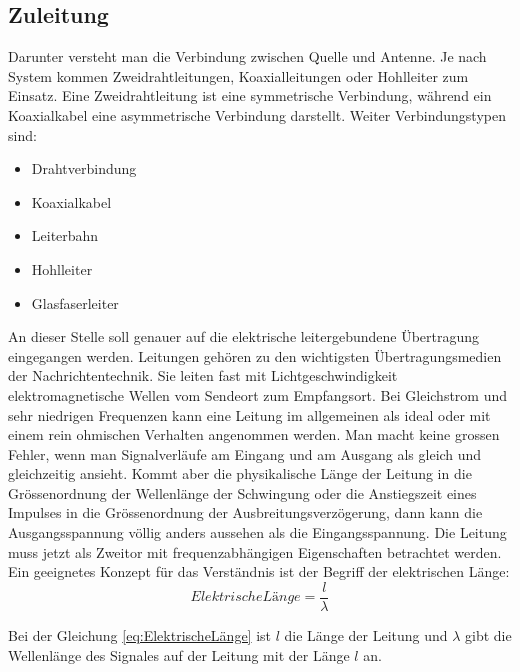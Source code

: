 \subsection{Zuleitung}
Darunter versteht man die Verbindung zwischen Quelle und Antenne. Je nach System kommen Zweidrahtleitungen, Koaxialleitungen oder Hohlleiter zum Einsatz. Eine Zweidrahtleitung ist eine symmetrische Verbindung, während ein Koaxialkabel eine asymmetrische Verbindung darstellt.
Weiter Verbindungstypen sind:
\begin{itemize}
\item Drahtverbindung
\item Koaxialkabel
\item Leiterbahn
\item Hohlleiter
\item Glasfaserleiter
\end{itemize}
An dieser Stelle soll genauer auf die elektrische leitergebundene Übertragung eingegangen werden.
Leitungen gehören zu den wichtigsten Übertragungsmedien der Nachrichtentechnik. Sie leiten fast mit Lichtgeschwindigkeit elektromagnetische Wellen vom Sendeort zum Empfangsort.
Bei Gleichstrom und sehr niedrigen Frequenzen kann eine Leitung im allgemeinen als ideal oder mit einem rein ohmischen Verhalten angenommen werden. Man macht keine grossen Fehler, wenn man Signalverläufe am Eingang und am Ausgang als gleich und gleichzeitig ansieht. Kommt aber die physikalische Länge der Leitung in die Grössenordnung der Wellenlänge der Schwingung oder die Anstiegszeit eines Impulses in die Grössenordnung der Ausbreitungsverzögerung, dann kann die Ausgangsspannung völlig anders aussehen als die Eingangsspannung. Die Leitung muss jetzt als Zweitor mit frequenzabhängigen Eigenschaften betrachtet werden.
Ein geeignetes Konzept für das Verständnis ist der Begriff der elektrischen Länge:
\begin{equation}
Elektrische Länge=\dfrac{l}{\lambda}\label{eq:ElektrischeLänge}
\end{equation}

Bei der  Gleichung \ref{eq:ElektrischeLänge} ist $l$ die Länge der Leitung und $\lambda$ gibt die Wellenlänge des Signales auf der Leitung mit der Länge $l$ an. 
			
